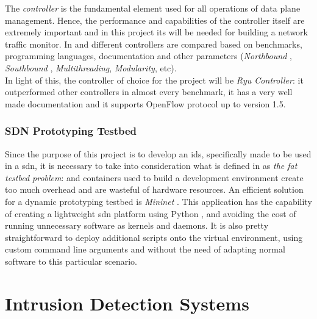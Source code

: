 The \textit{controller} is the fundamental element used for all operations of data plane management. Hence, the performance and capabilities of the controller itself are extremely important and in this project its  will be needed for building a network traffic monitor. In \cite{Bondkovskii2016} and \cite{Zhu2019} different controllers are compared based on benchmarks, programming languages, documentation and other parameters (\textit{Northbound }, \textit{Southbound }, \textit{Multithreading}, \textit{Modularity}, etc). \\ In light of this, the controller of choice for the project will be \textit{Ryu Controller}: it outperformed other controllers in almost every benchmark, it has a very well made documentation \cite{RyuDoc} and it supports OpenFlow protocol up to version 1.5.


\subsubsection{SDN Prototyping Testbed}
\label{subsec:sdn-testbed}

Since the purpose of this project is to develop an \gls{ids}, specifically made to be used in a \gls{sdn}, it is necessary to take into consideration what is defined in \cite{Lantz2015} as \textit{the fat testbed problem}:  and containers used to build a development environment create too much overhead and are wasteful of hardware resources. An efficient solution for a dynamic prototyping testbed is \textit{Mininet} \cite{MininetWebsite}. This application has the capability of creating a lightweight \gls{sdn} platform using Python , and avoiding the cost of running unnecessary software as kernels and daemons. It is also pretty straightforward to deploy additional scripts onto the virtual environment, using custom command line arguments and without the need of adapting normal software to this particular scenario.


\section{Intrusion Detection Systems}
\label{sec:intrusion-detection-system}

